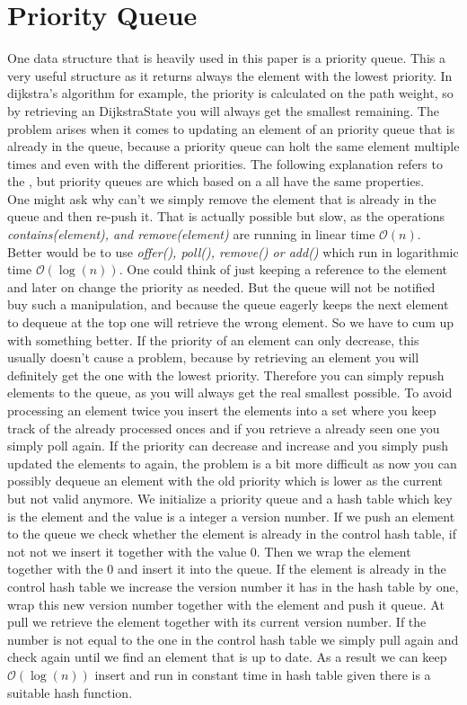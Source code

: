 \section{Priority Queue}

One data structure that is heavily used in this paper is a priority queue.
This a very useful structure as it returns always the element with the lowest priority.
In dijkstra's algorithm for example, the priority is calculated on the path weight, so by retrieving an DijkstraState you will always get the smallest remaining.
The problem arises when it comes to updating an element of an priority queue that is already in the queue, because a priority queue can holt the same element multiple times and even with the different priorities.
The following explanation refers to the \cite[Java 17 reference]{JavaPrioQueue}, but priority queues are which based on a \cite[binary heap]{floyd1964algorithm} all have the same properties.
\\
One might ask why can't we simply remove the element that is already in the queue and then re-push it.
That is actually possible but slow, as the operations \textit{contains(element), and remove(element)} are running in linear time $\mathcal{O}(n) $.
Better would be to use \textit{offer(), poll(), remove() or add()} which run in logarithmic time $\mathcal{O}( \log (n))$.
One could think of just keeping a reference to the element and later on change the priority as needed.
But the queue will not be notified buy such a manipulation, and because the queue eagerly keeps the next element to dequeue at the top one will retrieve the wrong element.
So we have to cum up with something better.
If the priority of an element can only decrease, this usually doesn't cause a problem, because by retrieving an element you will definitely get the one with the lowest priority.
Therefore you can simply repush elements to the queue, as you will always get the real smallest possible.
To avoid processing an element twice you insert the elements into a set where you keep track of the already processed onces and if you retrieve a already seen one you simply poll again.
If the priority can decrease and increase and you simply push updated the elements to again, the problem is a bit more difficult as now you can possibly dequeue an element with the old priority which is lower as the current but not valid anymore.
We initialize a priority queue and a hash table which key is the element and the value is a integer a version number.
If we push an element to the queue we check whether the element is already in the control hash table, if not not we insert it together with the value $0$.
Then we wrap the element together with the $0$ and insert it into the queue.
If the element is already in the control hash table we increase the version number it has in the hash table by one, wrap this new version number together with the element and push it queue.
At pull we retrieve the element together with its current version number.
If the number is not equal to the one in the control hash table we simply pull again and check again until we find an element that is up to date. 
As a result we can keep $\mathcal{O}( \log (n))$ insert and run in constant time in hash table given there is a suitable hash function.

